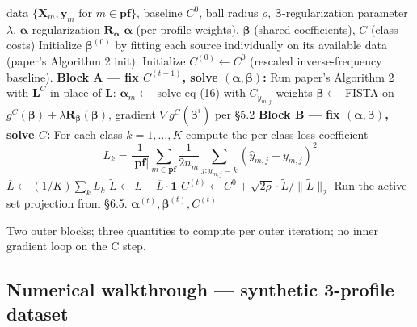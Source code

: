 \documentclass[11pt,a4paper]{article}
\begin{document}
\begin{algorithm}[H]
\caption{Cost-Sensitive iSFS via Block Coordinate Descent}
\begin{algorithmic}[1]
\Require data $\{\mathbf{X}_m, \mathbf{y}_m \text{ for } m \in \mathbf{pf}\}$, baseline $C^0$, ball radius $\rho$, $\boldsymbol{\beta}$-regularization parameter $\lambda$, $\boldsymbol{\alpha}$-regularization $\mathbf{R}_{\boldsymbol{\alpha}}$
\Ensure $\boldsymbol{\alpha}$ (per-profile weights), $\boldsymbol{\beta}$ (shared coefficients), $C$ (class costs)
\State Initialize $\boldsymbol{\beta}^{(0)}$ by fitting each source individually on its available data (paper's Algorithm 2 init).
\State Initialize $C^{(0)} \gets C^0$ (rescaled inverse-frequency baseline).
    \State \textbf{Block A --- fix $C^{(t-1)}$, solve $(\boldsymbol{\alpha}, \boldsymbol{\beta})$:}
    \State Run paper's Algorithm 2 with $\mathbf{L}^C$ in place of $\mathbf{L}$:
    \Repeat
            \State $\boldsymbol{\alpha}_m \gets$ solve eq (16) with $C_{y_{m,j}}$ weights
        \EndFor
        \State $\boldsymbol{\beta} \gets$ FISTA on $g^C(\boldsymbol{\beta}) + \lambda \mathbf{R}_{\boldsymbol{\beta}}(\boldsymbol{\beta})$, gradient $\nabla g^C(\boldsymbol{\beta}^i)$ per \S 5.2
    \State \textbf{Block B --- fix $(\boldsymbol{\alpha}, \boldsymbol{\beta})$, solve $C$:}
    \State For each class $k = 1, \ldots, K$ compute the per-class loss coefficient
    \[
        L_k = \frac{1}{|\mathbf{pf}|}\sum_{m \in \mathbf{pf}}\frac{1}{2 n_m}\sum_{j: y_{m,j}=k}(\hat{y}_{m,j} - y_{m,j})^2
    \]
    \State $\overline{L} \gets (1/K) \sum_k L_k$
    \State $\widetilde{L} \gets L - \overline{L}\cdot\mathbf{1}$
    \State $C^{(t)} \gets C^0 + \sqrt{2\rho} \cdot \widetilde{L} / \|\widetilde{L}\|_2$ 
        \State Run the active-set projection from \S 6.5.
    \EndIf
        \State \Return $\boldsymbol{\alpha}^{(t)}, \boldsymbol{\beta}^{(t)}, C^{(t)}$
    \EndIf
\EndFor
\end{algorithmic}
\end{algorithm}

Two outer blocks; three quantities to compute per outer iteration; no inner gradient loop on the C step.

\subsection{Numerical walkthrough --- synthetic 3-profile dataset}
\end{document}
